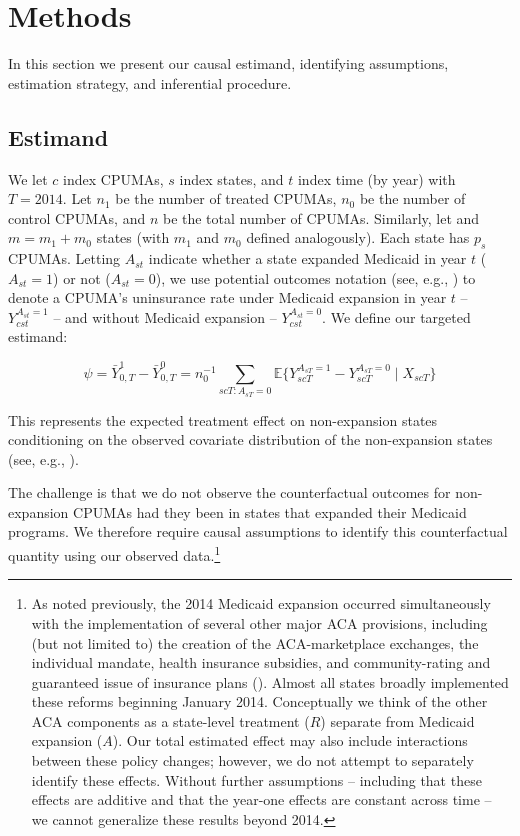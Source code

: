 \documentclass[aoas]{imsart}
\theoremstyle{plain}
\theoremstyle{remark}
\begin{document}
\section{Methods}\label{sec:methods}

In this section we present our causal estimand, identifying assumptions, estimation strategy, and inferential procedure.

\subsection{Estimand} \label{ssec:estimand}

We let $c$ index CPUMAs, $s$ index states, and $t$ index time (by year) with $T = 2014$. Let $n_1$ be the number of treated CPUMAs, $n_0$ be the number of control CPUMAs, and $n$ be the total number of CPUMAs. Similarly, let and $m = m_1 + m_0$ states (with $m_1$ and $m_0$ defined analogously). Each state has $p_s$ CPUMAs. Letting $A_{st}$ indicate whether a state expanded Medicaid in year $t$ ($A_{st} = 1$) or not ($A_{st} = 0$), we use potential outcomes notation (see, e.g., \cite{rubin2005causal}) to denote a CPUMA's uninsurance rate under Medicaid expansion in year $t$ -- $Y_{cst}^{A_{st} = 1}$ -- and without Medicaid expansion -- $Y_{cst}^{A_{st} = 0}$. We define our targeted estimand:

\begin{equation}
\psi = \bar{Y}_{0, T}^1 - \bar{Y}_{0, T}^0 = n_0^{-1}\sum_{scT: A_{sT} = 0} \mathbb{E}\{Y_{scT}^{A_{sT} = 1} - Y_{scT}^{A_{sT} = 0} \mid X_{scT}\}
\end{equation}

This represents the expected treatment effect on non-expansion states conditioning on the observed covariate distribution of the non-expansion states (see, e.g., \cite{imbens2004nonparametric}).

The challenge is that we do not observe the counterfactual outcomes for non-expansion CPUMAs had they been in states that expanded their Medicaid programs. We therefore require causal assumptions to identify this counterfactual quantity using our observed data.\footnote{As noted previously, the 2014 Medicaid expansion occurred simultaneously with the implementation of several other major ACA provisions, including (but not limited to) the creation of the ACA-marketplace exchanges, the individual mandate, health insurance subsidies, and community-rating and guaranteed issue of insurance plans (\cite{courtemanche2017early}). Almost all states broadly implemented these reforms beginning January 2014. Conceptually we think of the other ACA components as a state-level treatment ($R$) separate from Medicaid expansion ($A$). Our total estimated effect may also include interactions between these policy changes; however, we do not attempt to separately identify these effects. Without further assumptions -- including that these effects are additive and that the year-one effects are constant across time -- we cannot generalize these results beyond 2014.} 
\end{document}
